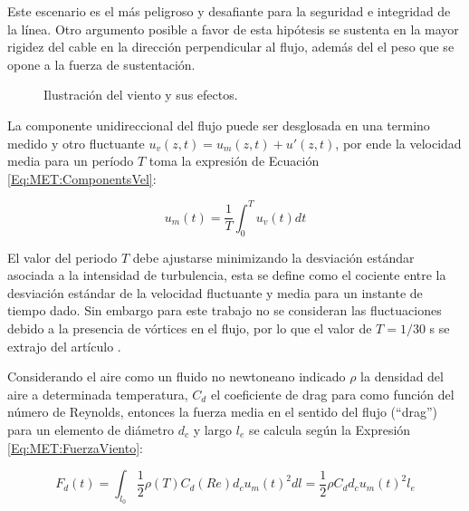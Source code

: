 Este escenario es el más peligroso y desafiante para la seguridad e integridad de la línea. Otro argumento posible a favor de esta hipótesis se sustenta en la mayor rigidez del cable en la dirección perpendicular al flujo, además del el peso que se opone a la fuerza de sustentación.
\begingroup
\begin{figure}[htbp]
	\centering
	\label{fig:MET:Viento:EsqViento}
	\label{fig:MET:Viento:DragLift}
	\caption{Ilustración del viento y sus efectos.} 	\label{fig:Met:Viento:Esquemas}
\end{figure}
\endgroup
La componente unidireccional del flujo puede ser desglosada en una termino medido y otro fluctuante $u_v(z,t)=u_m(z,t)+{u}'(z,t)$, por ende la velocidad media para un período $T$ toma la expresión de Ecuación \eqref{Eq:MET:ComponentsVel}:


\begin{equation}\label{Eq:MET:ComponentsVel}
	u_m(t)=\frac{1}{T}\int_{0}^{T}u_v(t)dt
\end{equation}


El valor del periodo $T$ debe ajustarse minimizando la desviación estándar asociada a la intensidad de turbulencia, esta se define como el cociente entre la desviación estándar de la velocidad fluctuante y  media para un instante de tiempo dado. Sin embargo para este trabajo no se consideran las fluctuaciones debido a la presencia de vórtices en el flujo, por lo que el valor de $T=1/30$ s se extrajo del artículo \citep{stengel2017measurements}.

Considerando el aire como un fluido no newtoneano indicado $\rho$ la densidad del aire a determinada temperatura, $C_d$ el coeficiente de drag para como función del número de Reynolds, entonces la fuerza media en el sentido del flujo (``drag'') para un elemento de diámetro $d_c$ y largo $l_e$ se calcula según la Expresión \eqref{Eq:MET:FuerzaViento}:

\begin{center}
	\begin{equation}
		\label{Eq:MET:FuerzaViento}
		F_d(t)=\int_{l_0}\frac{1}{2}{\rho (T)C_d(Re)d_cu_m(t)^2} dl= \frac{1}{2}\rho C_dd_cu_m(t)^2l_{e}
	\end{equation}
\end{center}



